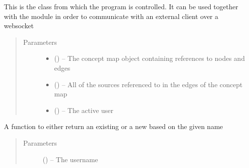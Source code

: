 \documentclass[letterpaper,10pt,english]{sphinxmanual}
\begin{document}
\begin{fulllineitems}
\label{\detokenize{consumer:consumer.Consumer}}
This is the class from which the program is controlled. It can be used together with the {\hyperref[\detokenize{handler:module-handler}]{}} module in order to communicate with an external client over a websocket
\begin{quote}\begin{description}
\item[{Parameters}] \leavevmode\begin{itemize}
\item {} 
 ({\hyperref[\detokenize{concept_map:concept_map.ConceptMap}]{}}) -- The concept map object containing references to nodes and edges

\item {} 
 (\href{https://docs.python.org/2/library/functions.html\#list}{}\sphinxstyleliteralemphasis{(}\href{https://docs.python.org/2/library/functions.html\#str}{}\sphinxstyleliteralemphasis{)}\sphinxstyleliteralemphasis{}) -- All of the sources referenced to in the edges of the concept map

\item {} 
 ({\hyperref[\detokenize{user:user.User}]{}}) -- The active user

\end{itemize}

\end{description}\end{quote}

\begin{fulllineitems}
\label{\detokenize{consumer:consumer.Consumer.authenticate}}
A function to either return an existing {\hyperref[\detokenize{user:user.User}]{}} or a new {\hyperref[\detokenize{user:user.User}]{}} based on the given name
\begin{quote}\begin{description}
\item[{Parameters}] \leavevmode
{} (\href{https://docs.python.org/2/library/functions.html\#str}{}) -- The username


\end{description}
\end{quote}
\end{fulllineitems}
\end{fulllineitems}
\end{document}
